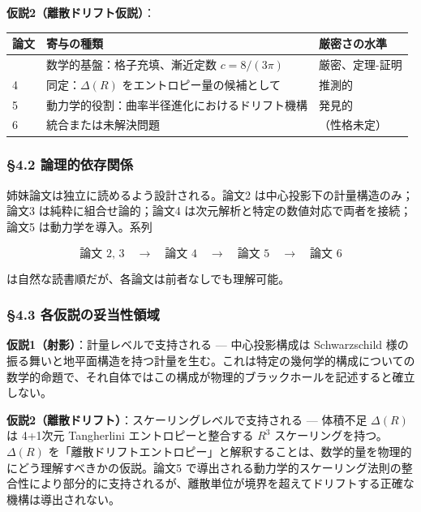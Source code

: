 \documentclass[a4paper,11pt]{ltjsarticle}
\theoremstyle{definition}
\begin{document}
\textbf{仮説2（離散ドリフト仮説）}：

{\def\LTcaptype{none} %
\begin{longtable}[]{@{}lll@{}}
\toprule\noalign{}
論文 & 寄与の種類 & 厳密さの水準 \\
\midrule\noalign{}
\endhead
\bottomrule\noalign{}
\endlastfoot
3 & 数学的基盤：格子充填、漸近定数 \(c = 8/(3\pi)\) & 厳密、定理-証明 \\
4 & 同定：\(\Delta(R)\) をエントロピー量の候補として & 推測的 \\
5 & 動力学的役割：曲率半径進化におけるドリフト機構 & 発見的 \\
6 & 統合または未解決問題 & （性格未定） \\
\end{longtable}
}

\subsubsection{§4.2
論理的依存関係}\label{ux8ad6ux7406ux7684ux4f9dux5b58ux95a2ux4fc2}

姉妹論文は独立に読めるよう設計される。論文2
は中心投影下の計量構造のみ；論文3 は純粋に組合せ論的；論文4
は次元解析と特定の数値対応で両者を接続；論文5 は動力学を導入。系列

\[\text{論文 2, 3} \quad\rightarrow\quad \text{論文 4} \quad\rightarrow\quad \text{論文 5} \quad\rightarrow\quad \text{論文 6}\]

は自然な読書順だが、各論文は前者なしでも理解可能。

\subsubsection{§4.3
各仮説の妥当性領域}\label{ux5404ux4eeeux8aacux306eux59a5ux5f53ux6027ux9818ux57df}

\textbf{仮説1（射影）}：計量レベルで支持される --- 中心投影構成は
Schwarzschild
様の振る舞いと地平面構造を持つ計量を生む。これは特定の幾何学的構成についての数学的命題で、それ自体ではこの構成が物理的ブラックホールを記述すると確立しない。

\textbf{仮説2（離散ドリフト）}：スケーリングレベルで支持される ---
体積不足 \(\Delta(R)\) は 4+1次元 Tangherlini エントロピーと整合する
\(R^3\) スケーリングを持つ。\(\Delta(R)\)
を「離散ドリフトエントロピー」と解釈することは、数学的量を物理的にどう理解すべきかの仮説。論文5
で導出される動力学的スケーリング法則の整合性により部分的に支持されるが、離散単位が境界を超えてドリフトする正確な機構は導出されない。
\end{document}
